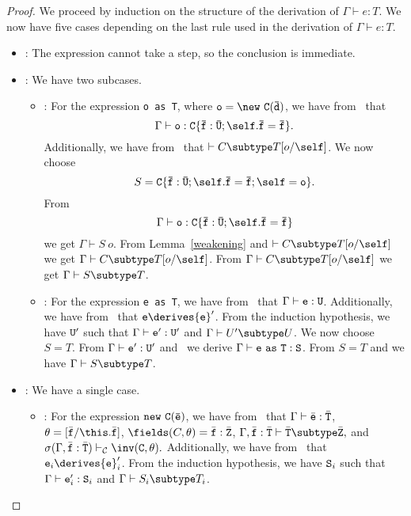 \begin{proof}
We proceed by induction on the
structure of the derivation of $\Gamma \vdash e: T$.  We now have five
cases depending on the last rule used in the derivation
of $\Gamma \vdash e: T$.
\begin{itemize}
\item
\TVar: The expression cannot take a step, so the conclusion is immediate.
\item
\TCast: We have two subcases.
   \begin{itemize}
   \item
   \RCast:  For the expression {\tt o~as~T}, where 
            ${\tt o} = {\tt \new\ {\tt C(\bar{\tt d})}}$,
            we have from \TCast\ that 
            $$\Gamma \vdash {\tt o: C\{\bar{\tt f}: \bar{U}
                {\tt ;\self.\bar{f}}=\bar{\tt f}\}}.$$
            Additionally, we have from \RCast\ that 
            $\vdash C \subtype T[o/\self]$.
            We now choose 
            $$S = {\tt C\{\bar{\tt f}: \bar{U}
                {\tt ;\self.\bar{f}}=\bar{\tt f}; \self=o\}}.$$
            From 
            $$\Gamma \vdash {\tt o: C\{\bar{\tt f}: \bar{U}
                {\tt ;\self.\bar{f}}=\bar{\tt f}\}}$$
            we get
            $\Gamma \vdash S\ o$.
            From Lemma~\ref{weakening} and $\vdash C \subtype T[o/\self]$ 
            we get 
            $\Gamma \vdash C \subtype T[o/\self]$.
            From $\Gamma \vdash C \subtype T[o/\self]$ we get
            $\Gamma \vdash 
                S \subtype T$.
   \item
   \RCCast: For the expression {\tt e~as~T}, we have from \TCast\ that
            $\Gamma \vdash {\tt e}: {\tt U}$.
            Additionally, we have from \RCCast\ that
            ${\tt e} \derives {{\tt e}}'$.
            From the induction hypothesis, we have ${\tt U}'$ such that
            $\Gamma \vdash {\tt e}': {\tt U}'$ and
            $\Gamma \vdash U' \subtype U$.
            We now choose $S=T$.
            From $\Gamma \vdash {\tt e}': {\tt U}'$ and \TCast\ we derive
            $\Gamma \vdash {\tt e~as~T} : {\tt S}$.
            From $S=T$ and 
            we have $\Gamma \vdash S \subtype T$.
   \end{itemize}
\item
\TNew: We have a single case.
   \begin{itemize}
   \item
   \RCNewArg: For the expression ${\tt new\ C(\bar{e})}$,
            we have from \TNew\ that
            $\Gamma \vdash \bar{\tt e}: \bar{\tt T}$,
            $\theta=[\bar{\tt f}/\this.\bar{\tt f}]$,
            $\fields(C,\theta)=\bar{\tt f}: \bar{\tt Z}$,
            $\Gamma, \bar{\tt f}: \bar{\tt T} \vdash 
                    \bar{\tt T} \subtype \bar{\tt Z},$ and 
            $\sigma(\Gamma, \bar{\tt f}: \bar{\tt T}) \vdash_{\cal C} 
                    \inv({\tt C},\theta).$
            Additionally, we have from \RCNewArg\ that
            ${\tt e}_i \derives {{\tt e}}_i'$.
            From the induction hypothesis, we have ${\tt S}_i$ such that
            $\Gamma \vdash {\tt e}_i': {{\tt S}}_i$ and 
            $\Gamma \vdash S_i \subtype T_i$.


\end{itemize}
\end{itemize}
\end{proof}
